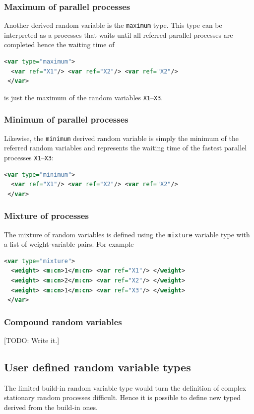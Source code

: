 \documentclass[a4paper, 10pt]{paper}
\newcommand{\todo}[1]{{\color{red}[TODO: #1]}}
\newcommand{\code}[1]{\texttt{#1}}
\begin{document}
\subsubsection{Maximum of parallel processes}
Another derived random variable is the \code{maximum} type. This type can be interpreted as a
processes that waits until all referred parallel processes are completed hence the waiting time
of
\begin{lstlisting}[language=XML]
 <var type="maximum">
  <var ref="X1"/> <var ref="X2"/> <var ref="X2"/>
 </var>
\end{lstlisting}
is just the maximum of the random variables \code{X1}--\code{X3}.

\subsubsection{Minimum of parallel processes}
Likewise, the \code{minimum} derived random variable is simply the minimum of the referred random
variables and represents the waiting time of the fastest parallel processes \code{X1}--\code{X3}:
\begin{lstlisting}[language=XML]
 <var type="minimum">
  <var ref="X1"/> <var ref="X2"/> <var ref="X2"/>
 </var>
\end{lstlisting}

\subsubsection{Mixture of processes}
The mixture of random variables is defined using the \code{mixture} variable type with a list of
weight-variable pairs. For example
\begin{lstlisting}[language=XML]
 <var type="mixture">
  <weight> <m:cn>1</m:cn> <var ref="X1"/> </weight>
  <weight> <m:cn>2</m:cn> <var ref="X2"/> </weight>
  <weight> <m:cn>1</m:cn> <var ref="X3"/> </weight>
 </var>
\end{lstlisting}

\subsubsection{Compound random variables} 
\todo{Write it.}

\subsection{User defined random variable types}
The limited build-in random variable type would turn the definition of complex stationary random
processes difficult. Hence it is possible to define new typed derived from the build-in ones.
\end{document}
